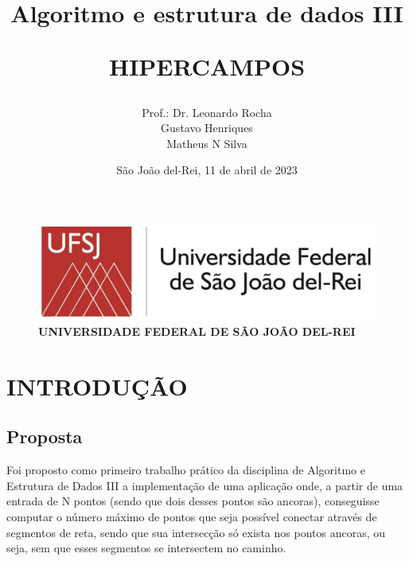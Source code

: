 \documentclass[12pt]{article}
\begin{document}
    \begin{figure}
        \centering
        \includegraphics[width=0.35\linewidth]{Figuras/ufsj-logo-2018}
        \\\setlength{\parskip}{1cm}
        \textbf{UNIVERSIDADE FEDERAL DE SÃO JOÃO DEL-REI}
        \label{fig:ufsj-logo-2018}
    \end{figure}

    \title{ 

        Algoritmo e estrutura de dados III 
		
        \vspace{5cm} %
		    \textbf{HIPERCAMPOS}
		\vspace{5cm} %
	}
    \author{Prof.: Dr. Leonardo Rocha \\ Gustavo Henriques \\ Matheus N Silva}
    \date{São João del-Rei, 11 de abril de 2023}
    \maketitle
    \thispagestyle{empty} %
    \newpage
    
    \setcounter{page}{1} %
    \tableofcontents %
    \newpage
    
    \setcounter{page}{1} %
    \section{INTRODUÇÃO} %
        \subsection{Proposta}
            Foi proposto como primeiro trabalho prático da disciplina de Algoritmo e
            Estrutura de Dados III a implementação de uma aplicação onde, a partir de 
            uma entrada de N pontos (sendo que dois desses pontos são ancoras), 
            conseguisse computar o número máximo de pontos que seja possível conectar 
            através de segmentos de reta, sendo que sua intersecção só exista nos pontos
            ancoras, ou seja, sem que esses segmentos se intersectem no caminho.
            
\end{document}
